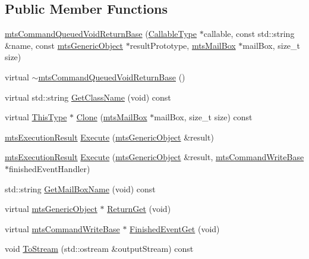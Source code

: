 \subsection*{Public Member Functions}
\begin{DoxyCompactItemize}
\item 
\hyperlink{classmts_command_queued_void_return_base_a9bbf129db24fd5d75684bc14d81535e6}{mts\+Command\+Queued\+Void\+Return\+Base} (\hyperlink{classmts_command_queued_void_return_base_a66e6a106a0c17625d9f0ec9a33ff634a}{Callable\+Type} $\ast$callable, const std\+::string \&name, const \hyperlink{classmts_generic_object}{mts\+Generic\+Object} $\ast$result\+Prototype, \hyperlink{classmts_mail_box}{mts\+Mail\+Box} $\ast$mail\+Box, size\+\_\+t size)
\item 
virtual \hyperlink{classmts_command_queued_void_return_base_ad2a3070b78c5bac00e8d6d7c798944f3}{$\sim$mts\+Command\+Queued\+Void\+Return\+Base} ()
\item 
virtual std\+::string \hyperlink{classmts_command_queued_void_return_base_acfdaaf157d65cf3b30a97fcfa6c01950}{Get\+Class\+Name} (void) const 
\item 
virtual \hyperlink{classmts_command_queued_void_return_base_a336bb46e1c968dc3003f9dc163c9f82c}{This\+Type} $\ast$ \hyperlink{classmts_command_queued_void_return_base_a21cc45ebaff3f83c0c39d264467dff4f}{Clone} (\hyperlink{classmts_mail_box}{mts\+Mail\+Box} $\ast$mail\+Box, size\+\_\+t size) const 
\item 
\hyperlink{classmts_execution_result}{mts\+Execution\+Result} \hyperlink{classmts_command_queued_void_return_base_a3a98e0b06cb0e7793d1ebccaad83bec9}{Execute} (\hyperlink{classmts_generic_object}{mts\+Generic\+Object} \&result)
\item 
\hyperlink{classmts_execution_result}{mts\+Execution\+Result} \hyperlink{classmts_command_queued_void_return_base_aceea05da6017b3b8fd3d6b1b7d34dd8e}{Execute} (\hyperlink{classmts_generic_object}{mts\+Generic\+Object} \&result, \hyperlink{classmts_command_write_base}{mts\+Command\+Write\+Base} $\ast$finished\+Event\+Handler)
\item 
std\+::string \hyperlink{classmts_command_queued_void_return_base_a599785ddb2248dc937215a3c6579df68}{Get\+Mail\+Box\+Name} (void) const 
\item 
virtual \hyperlink{classmts_generic_object}{mts\+Generic\+Object} $\ast$ \hyperlink{classmts_command_queued_void_return_base_ae92644324ed045effc08e0b6b2318660}{Return\+Get} (void)
\item 
virtual \hyperlink{classmts_command_write_base}{mts\+Command\+Write\+Base} $\ast$ \hyperlink{classmts_command_queued_void_return_base_abf2ce97d829469ae426a23f164a8364e}{Finished\+Event\+Get} (void)
\item 
void \hyperlink{classmts_command_queued_void_return_base_a7b6e745feb4966a04279f2a2ab12d481}{To\+Stream} (std\+::ostream \&output\+Stream) const 
\end{DoxyCompactItemize}

